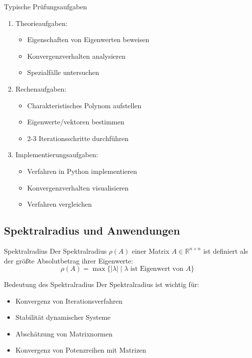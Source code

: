 \begin{KR}{Typische Prüfungsaufgaben}
\begin{enumerate}
    \item Theorieaufgaben:
    \begin{itemize}
        \item Eigenschaften von Eigenwerten beweisen
        \item Konvergenzverhalten analysieren
        \item Spezialfälle untersuchen
    \end{itemize}
    
    \item Rechenaufgaben:
    \begin{itemize}
        \item Charakteristisches Polynom aufstellen
        \item Eigenwerte/vektoren bestimmen
        \item 2-3 Iterationsschritte durchführen
    \end{itemize}
    
    \item Implementierungsaufgaben:
    \begin{itemize}
        \item Verfahren in Python implementieren
        \item Konvergenzverhalten visualisieren
        \item Verfahren vergleichen
    \end{itemize}
\end{enumerate}
\end{KR}

\subsection{Spektralradius und Anwendungen}

\begin{definition}{Spektralradius}
Der Spektralradius $\rho(A)$ einer Matrix $A \in \mathbb{R}^{n\times n}$ ist definiert als der größte Absolutbetrag ihrer Eigenwerte:
$$\rho(A) = \max\{|\lambda| \mid \lambda \text{ ist Eigenwert von } A\}$$
\end{definition}

\begin{concept}{Bedeutung des Spektralradius}
Der Spektralradius ist wichtig für:
\begin{itemize}
    \item Konvergenz von Iterationsverfahren
    \item Stabilität dynamischer Systeme 
    \item Abschätzung von Matrixnormen
    \item Konvergenz von Potenzreihen mit Matrizen
\end{itemize}
\end{concept}

